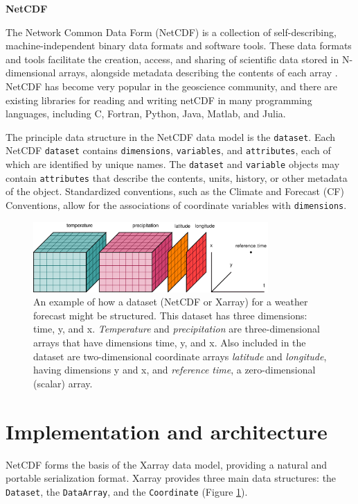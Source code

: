 \documentclass{jors}
\begin{document}
\textbf{NetCDF}

The Network Common Data Form (NetCDF) is a collection of self-describing, machine-independent binary data formats and software tools.
These data formats and tools facilitate the creation, access, and sharing of scientific data stored in N-dimensional arrays, alongside metadata describing the contents of each array \citep{Rew_1990}.
NetCDF has become very popular in the geoscience community, and there are existing libraries for reading and writing netCDF in many programming languages, including C, Fortran, Python, Java, Matlab, and Julia.

The principle data structure in the NetCDF data model is the \verb|dataset|.
Each NetCDF \verb|dataset| contains \verb|dimensions|, \verb|variables|, and \verb|attributes|, each of which are identified by unique names.
The \verb|dataset| and \verb|variable| objects may contain \verb|attributes| that describe the contents, units, history, or other metadata of the object.
Standardized conventions, such as the Climate and Forecast (CF) Conventions, \citep{eaton2003netcdf} allow for the associations of coordinate variables with \verb|dimensions|.

\begin{figure}
	\centering
	\includegraphics[width=0.8\textwidth]{dataset-diagram_original}
	\caption{An example of how a dataset (NetCDF or Xarray) for a weather forecast might be structured.  This dataset has three dimensions: time, y, and x.  \textit{Temperature} and \textit{precipitation} are three-dimensional arrays that have dimensions time, y, and x.  Also included in the dataset are two-dimensional coordinate arrays \textit{latitude} and \textit{longitude}, having dimensions y and x, and \textit{reference time}, a zero-dimensional (scalar) array.}
	\label{fig:dataset_diagram}
\end{figure}

\section*{Implementation and architecture}

NetCDF forms the basis of the Xarray data model, providing a natural and portable serialization format.
Xarray provides three main data structures: the \verb|Dataset|, the \verb|DataArray|, and the \verb|Coordinate| (Figure \ref{fig:dataset_diagram}).
\end{document}
